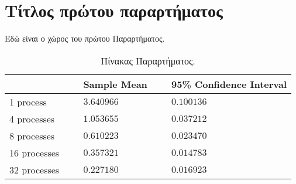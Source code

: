 \chapter{Τίτλος πρώτου παραρτήματος}
\label{app:FirstAppendix}

Εδώ είναι ο χώρος του πρώτου Παραρτήματος.

\begin{table}[h]
	\centering
	\caption{Πίνακας Παραρτήματος.}
	\label{tab:AppendixTable}
	\begin{tabular}{l l l l l}
		\hline
		~ & ~ & Sample Mean & ~ & 95\% Confidence Interval \\
		\hline
		1 process & ~ & $3.640966$  & ~ & $0.100136$ \\
		4 processes & ~ & $1.053655$  & ~ & $0.037212$ \\
		8 processes & ~ & $0.610223$  & ~ & $0.023470$ \\
		16 processes & ~ & $0.357321$  & ~ & $0.014783$ \\
		32 processes & ~ & $0.227180$  & ~ & $0.016923$ \\
		\hline
	\end{tabular}
\end{table}